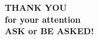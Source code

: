 \begin{frame}
    \vfill
    \centering
    \Huge\textbf{THANK YOU} \\ [0.1cm]
    \Large\textbf{for your attention} \\ [0.5cm]
    \Huge\textbf{ASK or BE ASKED!}
    \vfill
\end{frame}
